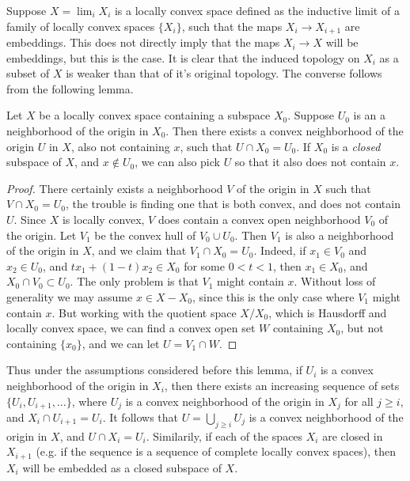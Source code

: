 Suppose $X = \lim_i X_i$ is a locally convex space defined as the inductive limit of a family of locally convex spaces $\{ X_i \}$, such that the maps $X_i \to X_{i+1}$ are embeddings. This does not directly imply that the maps $X_i \to X$ will be embeddings, but this is the case. It is clear that the induced topology on $X_i$ as a subset of $X$ is weaker than that of it's original topology. The converse follows from the following lemma.

\begin{lemma}
    Let $X$ be a locally convex space containing a subspace $X_0$. Suppose $U_0$ is an a neighborhood of the origin in $X_0$. Then there exists a convex neighborhood of the origin $U$ in $X$, also not containing $x$, such that $U \cap X_0 = U_0$. If $X_0$ is a \emph{closed} subspace of $X$, and $x \not \in U_0$, we can also pick $U$ so that it also does not contain $x$.
\end{lemma}
\begin{proof}
    There certainly exists a neighborhood $V$ of the origin in $X$ such that $V \cap X_0 = U_0$, the trouble is finding one that is both convex, and does not contain $U$. Since $X$ is locally convex, $V$ does contain a convex open neighborhood $V_0$ of the origin. Let $V_1$ be the convex hull of $V_0 \cup U_0$. Then $V_1$ is also a neighborhood of the origin in $X$, and we claim that $V_1 \cap X_0 = U_0$. Indeed, if $x_1 \in V_0$ and $x_2 \in U_0$, and $tx_1 + (1 - t)x_2 \in X_0$ for some $0 < t < 1$, then $x_1 \in X_0$, and $X_0 \cap V_0 \subset U_0$. The only problem is that $V_1$ might contain $x$. Without loss of generality we may assume $x \in X - X_0$, since this is the only case where $V_1$ might contain $x$. But working with the quotient space $X / X_0$, which is Hausdorff and locally convex space, we can find a convex open set $W$ containing $X_0$, but not containing $\{ x_0 \}$, and we can let $U = V_1 \cap W$.
\end{proof}

Thus under the assumptions considered before this lemma, if $U_i$ is a convex neighborhood of the origin in $X_i$, then there exists an increasing sequence of sets $\{ U_i, U_{i+1}, \dots \}$, where $U_j$ is a convex neighborhood of the origin in $X_j$ for all $j \geq i$, and $X_i \cap U_{i+1} = U_i$. It follows that $U = \bigcup_{j \geq i} U_j$ is a convex neighborhood of the origin in $X$, and $U \cap X_i = U_i$. Similarily, if each of the spaces $X_i$ are closed in $X_{i+1}$ (e.g. if the sequence is a sequence of complete locally convex spaces), then $X_i$ will be embedded as a closed subspace of $X$.

